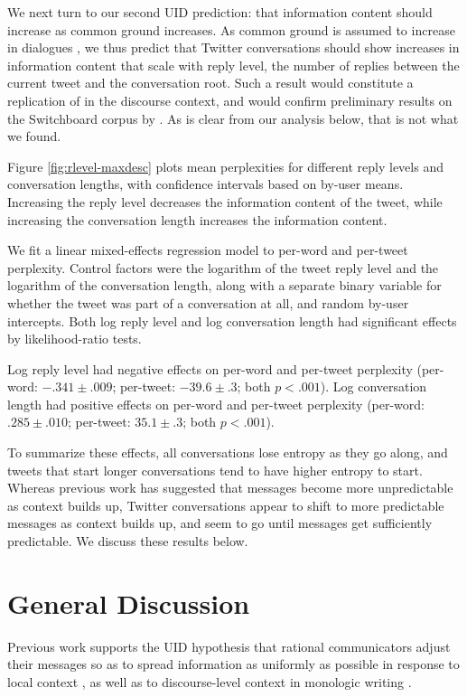 \documentclass[11pt,letterpaper]{article}
\begin{document}
We next turn to our second UID prediction: that information content should increase as common ground increases. As common ground is assumed to increase in dialogues \cite{clark1996}, we thus predict that Twitter conversations should show increases in information content that scale with reply level, the number of replies between the current tweet and the conversation root. Such a result would constitute a replication of  in the discourse context, and would confirm preliminary results on the Switchboard corpus by . As is clear from our analysis below, that is not what we found. 
	
Figure \ref{fig:rlevel-maxdesc} plots mean perplexities for different reply levels and conversation lengths, with confidence intervals based on by-user means. Increasing the reply level decreases the information content of the tweet, while increasing the conversation length increases the information content.

We fit a linear mixed-effects regression model to per-word and per-tweet perplexity.  Control factors were the logarithm of the tweet reply level and the logarithm of the conversation length, along with a separate binary variable for whether the tweet was part of a conversation at all, and random by-user intercepts.  Both log reply level and log conversation length had significant effects by likelihood-ratio tests.

Log reply level had negative effects on per-word and per-tweet perplexity (per-word: $-.341 \pm .009$; per-tweet: $-39.6 \pm .3$; both $p < .001$). Log conversation length had positive effects on per-word and per-tweet perplexity (per-word: $.285 \pm .010$; per-tweet: $35.1 \pm .3$; both $p < .001$).

To summarize these effects, all conversations lose entropy as they go along, and tweets that start longer conversations tend to have higher entropy to start.  Whereas previous work has suggested that messages become more unpredictable as context builds up, Twitter conversations appear to shift to more predictable messages as context builds up, and seem to go until messages get sufficiently predictable.  We discuss these results below.

\section{General Discussion}

Previous work supports the UID hypothesis that rational communicators adjust their messages so as to spread information as uniformly as possible in response to local context \cite{aylett2004,levy2007}, as well as to discourse-level context in monologic writing \cite{genzel2002,qian2012}. 
\end{document}
